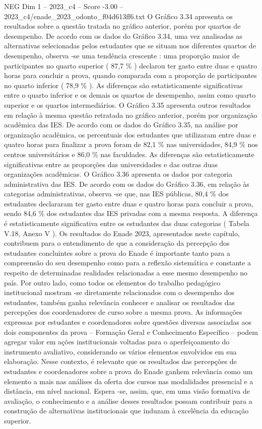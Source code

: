 \begin{textsample}{NEG Dim 1 – 2023\_c4 – Score -3.00 – 2023\_c4/enade\_2023\_odonto\_f04d613ff6.txt}
O Gráfico 3.34 apresenta os resultados sobre a questão tratada no gráfico anterior, porém por quartos de desempenho.
De acordo com os dados do Gráfico 3.34, uma vez analisadas as alternativas selecionadas pelos estudantes que se situam nos diferentes quartos de desempenho, observa -se uma tendência crescente : uma proporção maior de participantes no quarto superior ( 87,7 \% ) declarou ter gasto entre duas e quatro horas para concluir a prova, quando comparada com a proporção de participantes no quarto inferior ( 78,9 \% ).
As diferenças são estatisticamente significativas entre o quarto inferior e os demais os quartos de desempenho, assim como quarto superior e os quartos intermediários.
O Gráfico 3.35 apresenta outros resultados em relação à mesma questão retratada no gráfico anterior, porém por organização acadêmica das IES.
De acordo com os dados do Gráfico 3.35, na análise por organização acadêmica, os percentuais dos estudantes que utilizaram entre duas e quatro horas para finalizar a prova foram de 82,1 \% nas universidades, 84,9 \% nos centros universitários e 86,0 \% nas faculdades.
As diferenças são estatisticamente significativas entre as proporções das universidades e das outras duas organizações acadêmicas.
O Gráfico 3.36 apresenta os dados por categoria administrativa das IES.
De acordo com os dados do Gráfico 3.36, em relação às categorias administrativas, observa -se que, nas IES públicas, 80,4 \% dos estudantes declararam ter gasto entre duas e quatro horas para concluir a prova, sendo 84,6 \% dos estudantes das IES privadas com a mesma resposta.
A diferença é estatisticamente significativa entre os estudantes das duas categorias ( Tabela V.18, Anexo V ).
Os resultados do Enade 2023, apresentados neste capítulo, contribuem para o entendimento de que a consideração da percepção dos estudantes concluintes sobre a prova do Enade é importante tanto para a compreensão do seu desempenho como para a reflexão sistemática e constante a respeito de determinadas realidades relacionadas a esse mesmo desempenho no país.
Por outro lado, como todos os elementos do trabalho pedagógico institucional mostram -se diretamente relacionados com o desempenho dos estudantes, também ganha relevância conhecer e analisar os resultados das percepções dos coordenadores de curso sobre a mesma prova.
As informações expressas por estudantes e coordenadores sobre questões diversas associadas aos dois componentes da prova – Formação Geral e Conhecimento Específico – podem agregar valor em ações institucionais voltadas para o aperfeiçoamento do instrumento avaliativo, considerando os vários elementos envolvidos em sua elaboração.
Nesse contexto, é relevante que os resultados das percepções de estudantes e coordenadores sobre a prova do Enade ganhem relevância como um elemento a mais nas análises da oferta dos cursos nas modalidades presencial e a distância, em nível nacional.
Espera -se, assim, que, em uma visão formativa de avaliação, o conhecimento e a análise desses resultados possam contribuir para a construção de alternativas institucionais que induzam à excelência da educação superior.

\end{textsample}
